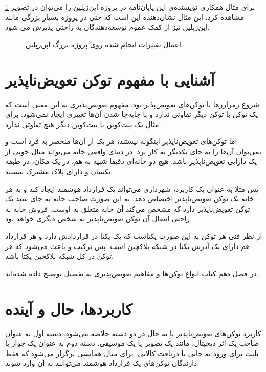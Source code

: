 برای مثال همکاری
نویسنده‌ی این پایان‌نامه در پروژه اپن‌زپلین را می‌توان در تصویر
\ref{fig:zeppelin-merge-req}
مشاهده کرد.
این مثال نشان‌دهنده این است که حتی در پروژه بسیار بزرگی مانند اپن‌زپلین نیز
از کمک عموم توسعه‌دهندگان به راحتی پذیرش می شود.

\begin{figure}[H]
\centerline{}
\caption{اعمال تغییرات انجام شده روی پروژه بزرگ اپن‌زپلین}
\label{fig:zeppelin-merge-req}
\end{figure}


\section{آشنایی با مفهوم توکن تعویض‌ناپذیر}
شروع رمزارزها با توکن‌های تعویض‌پذیر بود.
مفهوم تعویض‌پذیری به این معنی است که یک توکن با توکن دیگر تفاوتی ندارد
و با جابه‌جا شدن آن‌ها تغییری ایجاد نمی‌شود.
برای مثال یک بیت‌کوین با بیت‌کوین دیگر هیچ تفاوتی ندارد.

اما توکن‌های تعویض‌ناپذیر اینگونه نیستند،
هر یک از آن‌ها منحصر به فرد است و نمی‌توان آن‌ها را به جای یکدیگر به کار برد.
در دنیای واقعی خانه می‌تواند مثال خوبی از یک دارایی تعویض‌ناپذیر باشد.
هیچ دو خانه‌ای دقیقا شبیه به هم، در یک مکان، در طبقه یکسان و دارای پلاک مشترک نیستند.

پس مثلا به عنوان یک کاربرد،
شهرداری می‌تواند یک قرارداد هوشمند ایجاد کند
و به هر خانه یک توکن تعویض‌ناپذیر اختصاص دهد.
به این صورت صاحب خانه به جای سند یک توکن تعویض‌ناپذیر دارد
که مشخص می‌کند آن خانه متعلق به اوست.
فروش خانه به راحتی انتقال آن توکن تعویض‌ناپذیر به شخص دیگری خواهد بود.

از نظر فنی هر توکن به این صورت یکتاست که یک
یکتا در قراردادش دارد و هر قرارداد هم دارای یک آدرس یکتا در شبکه بلاکچین است. پس ترکیب
و
باعث می‌شود که هر توکن در کل شبکه بلاکچین یکتا باشد.

در فصل دهم کتاب
\cite{MasteringEthereum}
انواع توکن‌ها و مفاهیم تعویض‌پذیری به تفصیل توضیح داده شده‌اند.


\section{کاربردها، حال و آینده}
کاربرد توکن‌های تعویض‌ناپذیر تا به حال در دو دسته خلاصه می‌شود.
دسته اول به عنوان صاحب یک اثر دیجیتال،
مانند یک تصویر یا یک موسیقی.
دسته دوم به عنوان یک جواز یا بلیت برای ورود به جایی یا دریافت کالایی.
برای مثال همایشی برگزار می‌شود که فقط دارندگان توکن‌های یک قرارداد هوشمند می‌توانند به آن وارد شوند.

